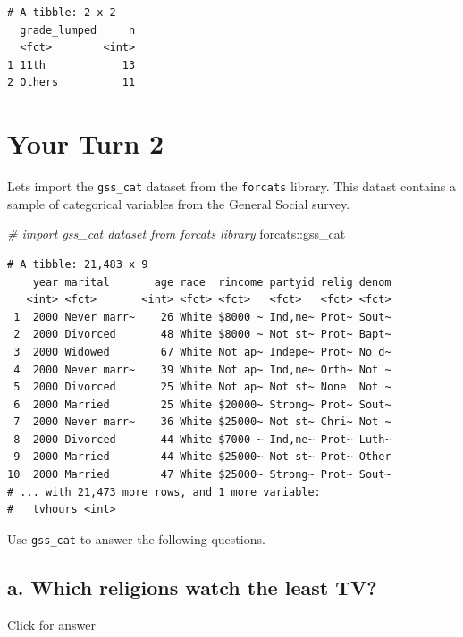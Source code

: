 \documentclass[
]{book}
\newenvironment{Shaded}{\begin{snugshade}}{\end{snugshade}}
\newcommand{\CommentTok}[1]{\textcolor[rgb]{0.56,0.35,0.01}{\textit{#1}}}
\newcommand{\NormalTok}[1]{#1}
\newcommand{\SpecialCharTok}[1]{\textcolor[rgb]{0.00,0.00,0.00}{#1}}
\begin{document}
\begin{verbatim}
# A tibble: 2 x 2
  grade_lumped     n
  <fct>        <int>
1 11th            13
2 Others          11
\end{verbatim}

\hypertarget{your-turn-2-2}{%
\section{Your Turn 2}\label{your-turn-2-2}}

Lets import the \texttt{gss\_cat} dataset from the \texttt{forcats} library. This datast contains a sample of categorical variables from the General Social survey.

\begin{Shaded}
\begin{Highlighting}[]
\CommentTok{\# import gss\_cat dataset from forcats library}
\NormalTok{forcats}\SpecialCharTok{::}\NormalTok{gss\_cat}
\end{Highlighting}
\end{Shaded}

\begin{verbatim}
# A tibble: 21,483 x 9
    year marital       age race  rincome partyid relig denom
   <int> <fct>       <int> <fct> <fct>   <fct>   <fct> <fct>
 1  2000 Never marr~    26 White $8000 ~ Ind,ne~ Prot~ Sout~
 2  2000 Divorced       48 White $8000 ~ Not st~ Prot~ Bapt~
 3  2000 Widowed        67 White Not ap~ Indepe~ Prot~ No d~
 4  2000 Never marr~    39 White Not ap~ Ind,ne~ Orth~ Not ~
 5  2000 Divorced       25 White Not ap~ Not st~ None  Not ~
 6  2000 Married        25 White $20000~ Strong~ Prot~ Sout~
 7  2000 Never marr~    36 White $25000~ Not st~ Chri~ Not ~
 8  2000 Divorced       44 White $7000 ~ Ind,ne~ Prot~ Luth~
 9  2000 Married        44 White $25000~ Not st~ Prot~ Other
10  2000 Married        47 White $25000~ Strong~ Prot~ Sout~
# ... with 21,473 more rows, and 1 more variable:
#   tvhours <int>
\end{verbatim}

Use \texttt{gss\_cat} to answer the following questions.

\hypertarget{a.-which-religions-watch-the-least-tv}{%
\subsection{a. Which religions watch the least TV?}\label{a.-which-religions-watch-the-least-tv}}

Click for answer
\end{document}
